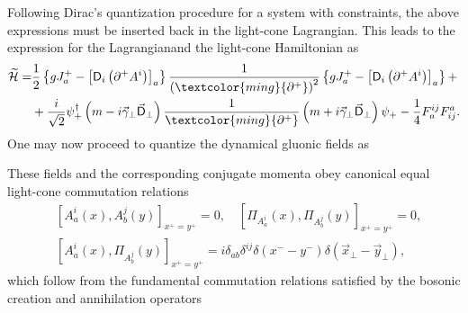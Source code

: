 Following Dirac's quantization procedure \cite{dirac} for a system with constraints, the above expressions must be inserted back in the light-cone Lagrangian. This leads to the expression for the Lagrangianand the light-cone Hamiltonian as 
\begin{equation*}
\begin{aligned}
\widetilde{\mathcal{H}}=&\frac{1}{2}\left\lbrace gJ_a^+-\left[\textsf{D}_i\left(\partial^+A^i\right)\right]_a\right\rbrace\frac{1}{\left(\textcolor{ming}{\partial^+}\right)^2}\left\lbrace gJ_a^+-\left[\textsf{D}_i\left(\partial^+A^i\right)\right]_a\right\rbrace+\\
&+\frac{i}{\sqrt{2}}\psi_+^\dag\left(m-i\vec{\gamma}_\perp\vec{\textsf{D}}_\perp\right)\frac{1}{\textcolor{ming}{\partial^+}}\left(m+i\vec{\gamma}_\perp\vec{\textsf{D}}_\perp\right)\psi_+-\frac{1}{4}F^{ij}_aF_{ij}^a.
\end{aligned}
\end{equation*}
One may now proceed to quantize the dynamical gluonic fields as
\begin{fullwidth}
\end{fullwidth}
These fields and the corresponding conjugate momenta obey canonical equal light-cone commutation relations
\begin{equation*}
\begin{aligned}
&\left[A_a^i(x),A_b^j(y)\right]_{x^+=y^+}=0,\quad\left[\Pi_{A_a^i}(x),\Pi_{A_b^j}(y)\right]_{x^+=y^+}=0,\\
&\left[A_a^i(x),\Pi_{A_b^j}(y)\right]_{x^+=y^+}=i\delta_{ab}\delta^{ij}\delta(x^--y^-)\delta(\vec{x}_\perp-\vec{y}_\perp),
\end{aligned}
\end{equation*}
which follow from the fundamental commutation relations satisfied by the bosonic creation and annihilation operators
